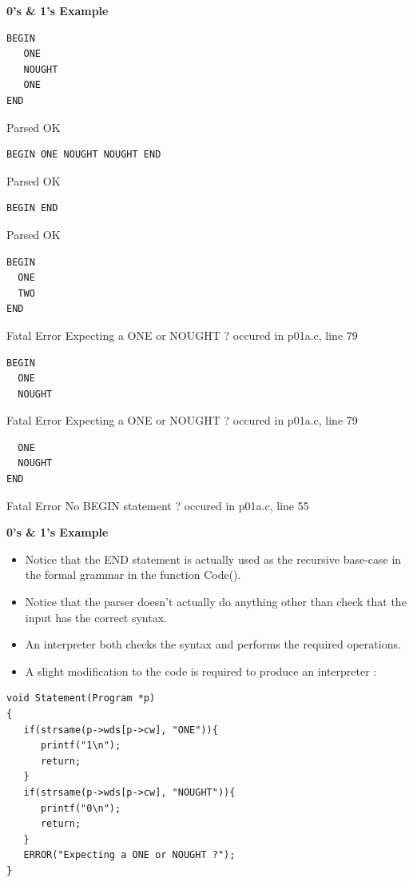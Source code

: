 \newpage
{\samepage
\begin{center}
{\Large{\bf 0's \& 1's Example}}
\end{center}
{\small
{\bf \begin{verbatim}
BEGIN
   ONE
   NOUGHT
   ONE
END
\end{verbatim}
}
\vspace*{-1.5ex}
Parsed OK

{\bf \begin{verbatim}
BEGIN ONE NOUGHT NOUGHT END
\end{verbatim} }
\vspace*{-1.5ex}
Parsed OK

{\bf \begin{verbatim}
BEGIN END
\end{verbatim} }
\vspace*{-1.5ex}
Parsed OK

{\bf \begin{verbatim}
BEGIN
  ONE
  TWO
END
\end{verbatim} }
\vspace*{-1.5ex}
Fatal Error Expecting a ONE or NOUGHT ?
occured in p01a.c, line 79

{\bf \begin{verbatim}
BEGIN
  ONE
  NOUGHT
\end{verbatim} }
\vspace*{-1.5ex}
Fatal Error Expecting a ONE or NOUGHT ?
occured in p01a.c, line 79

{\bf \begin{verbatim}
  ONE
  NOUGHT
END
\end{verbatim} }
\vspace*{-1.5ex}
Fatal Error No BEGIN statement ?
occured in p01a.c, line 55
}}

\newpage
{\samepage
\begin{center}
{\Large{\bf 0's \& 1's Example}}
\end{center}
{\small
\begin{itemize}
\item Notice that the END statement is actually used as the recursive base-case in the formal grammar in the function Code().
\item Notice that the parser doesn't actually do anything other than check that the input has the correct syntax.
\item An interpreter both checks the syntax and performs the required operations.
\item A slight modification to the code is required to produce an interpreter :
\end{itemize}
\begin{verbatim}
void Statement(Program *p)
{
   if(strsame(p->wds[p->cw], "ONE")){
      printf("1\n");
      return;
   }
   if(strsame(p->wds[p->cw], "NOUGHT")){
      printf("0\n");
      return;
   }
   ERROR("Expecting a ONE or NOUGHT ?");
}
\end{verbatim}
}}

